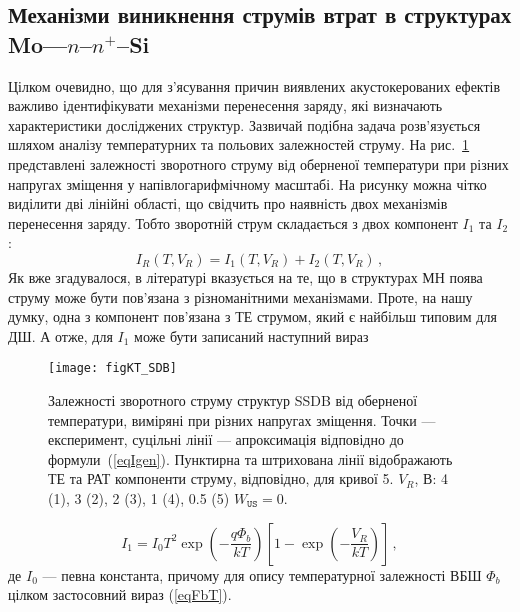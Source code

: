 \subsection{Механізми виникнення струмів втрат в структурах Mo---$n$--$n^+$--Si}

Цілком очевидно, що для з'ясування причин виявлених акустокерованих ефектів важливо ідентифікувати
механізми перенесення заряду, які визначають характеристики досліджених структур.
Зазвичай подібна задача розв'язується шляхом аналізу температурних та польових залежностей струму.
На рис.~\ref{figKT_SDB} представлені залежності зворотного струму від оберненої температури при різних напругах зміщення
у напівлогарифмічному масштабі.
На рисунку можна чітко виділити дві лінійні області, що свідчить про наявність двох механізмів
перенесення заряду.
Тобто зворотній струм складається з двох компонент $I_{1}$ та $I_2$:
\begin{equation}\label{eqIsum}
    I_R(T,V_R)=I_1(T,V_R)+I_2(T,V_R)\,,
\end{equation}
Як вже згадувалося, в літературі вказується на те, що в структурах МН поява струму може бути пов'язана з
різноманітними механізмами.
Проте, на нашу думку, одна з компонент пов'язана з ТЕ струмом, який є найбільш типовим для ДШ.
А отже, для $I_1$ може бути записаний наступний вираз

\begin{figure}
\center
\texttt{[image: figKT\_SDB]}
\caption{\label{figKT_SDB}
Залежності зворотного струму структур SSDB від оберненої температури,
виміряні при різних напругах зміщення.
Точки --- експеримент,
суцільні лінії --- апроксимація відповідно до формули~(\ref{eqIgen}).
Пунктирна та штрихована лінії відображають ТЕ та РАТ компоненти струму, відповідно, для кривої 5.
$V_R$, В: 4 (1), 3 (2), 2 (3), 1 (4), 0.5 (5)
$W_\mathtt{US}=0$.
}%
\end{figure}

\begin{equation}\label{eqIte_SDB}
    I_1=I_0T^2\exp\left(-\frac{q\Phi_b}{kT}\right)\left[1-\exp\left(-\frac{V_R}{kT}\right)\right]\,,
\end{equation}
де $I_0$ --- певна константа,
причому для опису температурної залежності ВБШ $\Phi_b$ цілком застосовний вираз (\ref{eqFbT}).

